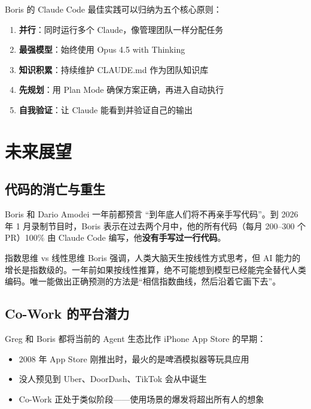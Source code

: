 \documentclass[a4paper]{article}
\begin{document}
Boris 的 Claude Code 最佳实践可以归纳为五个核心原则：
\begin{enumerate}
    \item \textbf{并行}：同时运行多个 Claude，像管理团队一样分配任务
    \item \textbf{最强模型}：始终使用 Opus 4.5 with Thinking
    \item \textbf{知识积累}：持续维护 CLAUDE.md 作为团队知识库
    \item \textbf{先规划}：用 Plan Mode 确保方案正确，再进入自动执行
    \item \textbf{自我验证}：让 Claude 能看到并验证自己的输出
\end{enumerate}

\section{未来展望}

\subsection{代码的消亡与重生}

Boris 和 Dario Amodei 一年前都预言 ``到年底人们将不再亲手写代码''。到 2026 年 1 月录制节目时，Boris 表示在过去两个月中，他的所有代码（每月 200--300 个 PR）100\% 由 Claude Code 编写，他\textbf{没有手写过一行代码}。

\begin{knowledgebox}{指数思维 vs 线性思维}
Boris 强调，人类大脑天生按线性方式思考，但 AI 能力的增长是指数级的。一年前如果按线性推算，绝不可能想到模型已经能完全替代人类编码。唯一能做出正确预测的方法是``相信指数曲线，然后沿着它画下去''。
\end{knowledgebox}

\subsection{Co-Work 的平台潜力}

Greg 和 Boris 都将当前的 Agent 生态比作 iPhone App Store 的早期：

\begin{itemize}
    \item 2008 年 App Store 刚推出时，最火的是啤酒模拟器等玩具应用
    \item 没人预见到 Uber、DoorDash、TikTok 会从中诞生
    \item Co-Work 正处于类似阶段——使用场景的爆发将超出所有人的想象
\end{itemize}
\end{document}
